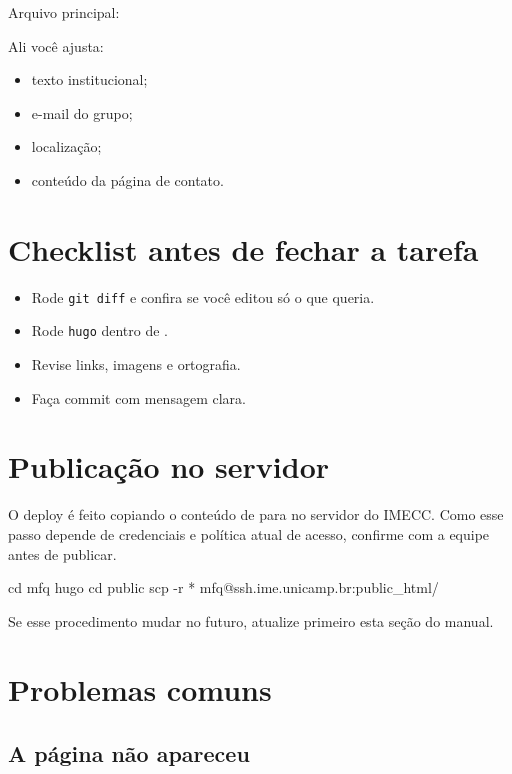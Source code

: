 \documentclass[11pt,a4paper]{article}
\begin{document}
Arquivo principal: 

Ali você ajusta:

\begin{itemize}
  \item texto institucional;
  \item e-mail do grupo;
  \item localização;
  \item conteúdo da página de contato.
\end{itemize}

\section{Checklist antes de fechar a tarefa}

\begin{itemize}
  \item Rode \texttt{git diff} e confira se você editou só o que queria.
  \item Rode \texttt{hugo} dentro de .
  \item Revise links, imagens e ortografia.
  \item Faça commit com mensagem clara.
\end{itemize}

\section{Publicação no servidor}

O deploy é feito copiando o conteúdo de  para
 no servidor do IMECC. Como esse passo depende de credenciais e política atual
de acesso, confirme com a equipe antes de publicar.

\begin{terminal}
cd mfq
hugo
cd public
scp -r * mfq@ssh.ime.unicamp.br:public_html/
\end{terminal}

Se esse procedimento mudar no futuro, atualize primeiro esta seção do manual.

\section{Problemas comuns}

\subsection{A página não apareceu}
\end{document}
